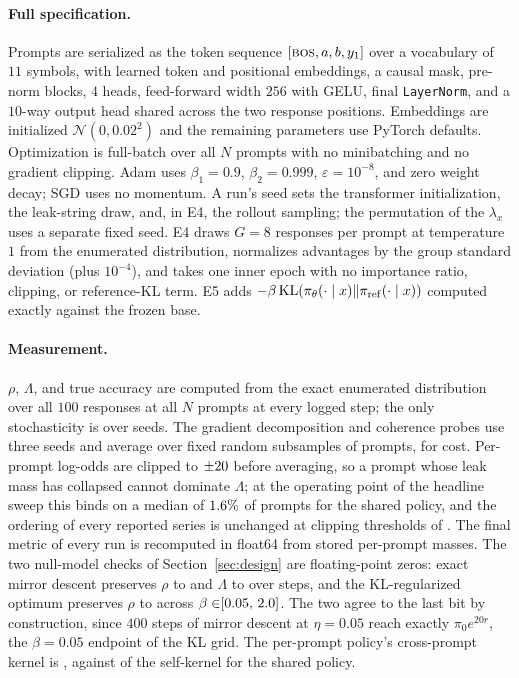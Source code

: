 \paragraph{Full specification.} Prompts are serialized as the token sequence $[\textsc{bos}, a, b, y_1]$ over a vocabulary of $11$ symbols, with learned token and positional embeddings, a causal mask, pre-norm blocks, $4$ heads, feed-forward width $256$ with GELU, final \texttt{LayerNorm}, and a $10$-way output head shared across the two response positions. Embeddings are initialized $\mathcal{N}(0, 0.02^2)$ and the remaining parameters use PyTorch defaults. Optimization is full-batch over all $N$ prompts with no minibatching and no gradient clipping. Adam uses $\beta_1=0.9$, $\beta_2=0.999$, $\varepsilon=10^{-8}$, and zero weight decay; SGD uses no momentum. A run's seed sets the transformer initialization, the leak-string draw, and, in E4, the rollout sampling; the permutation of the $\lambda_x$ uses a separate fixed seed. E4 draws $G=8$ responses per prompt at temperature $1$ from the enumerated distribution, normalizes advantages by the group standard deviation (plus $10^{-4}$), and takes one inner epoch with no importance ratio, clipping, or reference-KL term. E5 adds $-\beta\,\mathrm{KL}(\pi_\theta(\cdot\mid x)\Vert\pi_{\mathrm{ref}}(\cdot\mid x))$ computed exactly against the frozen base.

\paragraph{Measurement.} $\rho$, $\Lambda$, and true accuracy are computed from the exact enumerated distribution over all $100$ responses at all $N$ prompts at every logged step; the only stochasticity is over seeds. The gradient decomposition and coherence probes use three seeds and average over fixed random subsamples of prompts, for cost. Per-prompt log-odds are clipped to $\pm20{}$ before averaging, so a prompt whose leak mass has collapsed cannot dominate $\Lambda$; at the operating point of the headline sweep this binds on a median of $1.6\%{}$ of prompts for the shared policy, and the ordering of every reported series is unchanged at clipping thresholds of \LamClipChecked{}. The final metric of every run is recomputed in float64 from stored per-prompt masses. The two null-model checks of Section~\ref{sec:design} are floating-point zeros: exact mirror descent preserves $\rho$ to \NullDriftMirror{} and $\Lambda$ to \NullDriftMirrorLam{} over \NullMirrorSteps{} steps, and the KL-regularized optimum preserves $\rho$ to \NullDriftKL{} across $\beta \in \NullBetaRange{}$. The two agree to the last bit by construction, since $400$ steps of mirror descent at $\eta=0.05$ reach exactly $\pi_0 e^{20 r}$, the $\beta=0.05$ endpoint of the KL grid. The per-prompt policy's cross-prompt kernel is \KernelRatioTab{}, against \KernelRatioNeural{} of the self-kernel for the shared policy.


